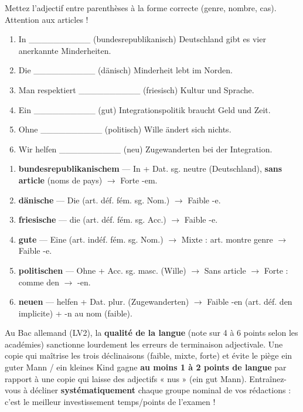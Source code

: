 \documentclass[11pt]{article}
\newcommand{\cle}[1]{{\popxbold\color{popdark}#1}}
\begin{document}
\begin{exercice}
Mettez l'adjectif entre parenthèses à la forme correcte (genre, nombre, cas). Attention aux articles !

\begin{enumerate}
    \item In \_\_\_\_\_\_\_\_\_\_ (bundesrepublikanisch) Deutschland gibt es vier anerkannte Minderheiten.
    \item Die \_\_\_\_\_\_\_\_\_\_ (dänisch) Minderheit lebt im Norden.
    \item Man respektiert \_\_\_\_\_\_\_\_\_\_ (friesisch) Kultur und Sprache.
    \item Ein \_\_\_\_\_\_\_\_\_\_ (gut) Integrationspolitik braucht Geld und Zeit.
    \item Ohne \_\_\_\_\_\_\_\_\_\_ (politisch) Wille ändert sich nichts.
    \item Wir helfen \_\_\_\_\_\_\_\_\_\_ (neu) Zugewanderten bei der Integration.
\end{enumerate}
\end{exercice}

\begin{corrige}
\begin{enumerate}
    \item \textbf{bundesrepublikanischem} — \cle{In} + Dat. sg. neutre (\cle{Deutschland}), \textbf{sans article} (noms de pays) $\rightarrow$ Forte \cle{-em}.
    \item \textbf{dänische} — \cle{Die} (art. déf. fém. sg. Nom.) $\rightarrow$ Faible \cle{-e}.
    \item \textbf{friesische} — \cle{die} (art. déf. fém. sg. Acc.) $\rightarrow$ Faible \cle{-e}.
    \item \textbf{gute} — \cle{Eine} (art. indéf. fém. sg. Nom.) $\rightarrow$ Mixte : art. montre genre $\rightarrow$ Faible \cle{-e}.
    \item \textbf{politischen} — \cle{Ohne} + Acc. sg. masc. (\cle{Wille}) $\rightarrow$ Sans article $\rightarrow$ Forte : comme \cle{den} $\rightarrow$ \cle{-en}.
    \item \textbf{neuen} — \cle{helfen} + Dat. plur. (\cle{Zugewanderten}) $\rightarrow$ Faible \cle{-en} (art. déf. \cle{den} implicite) + \cle{-n} au nom (faible).
\end{enumerate}
\end{corrige}

\begin{savaistu}
Au Bac allemand (LV2), la \textbf{qualité de la langue} (note sur 4 à 6 points selon les académies) sanctionne lourdement les erreurs de terminaison adjectivale. Une copie qui maîtrise les trois déclinaisons (faible, mixte, forte) et évite le piège \cle{ein guter Mann} / \cle{ein kleines Kind} gagne \textbf{au moins 1 à 2 points de langue} par rapport à une copie qui laisse des adjectifs « nus » (\cle{ein gut Mann}). Entraînez-vous à décliner \textbf{systématiquement} chaque groupe nominal de vos rédactions : c'est le meilleur investissement temps/points de l'examen !
\end{savaistu}
\end{document}
